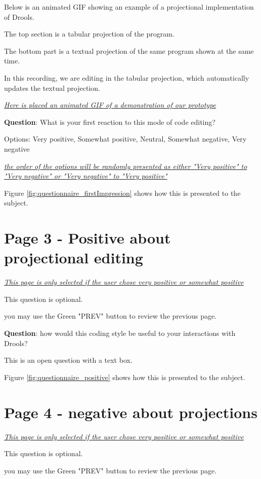 Below is an animated GIF showing an example of a projectional implementation of Drools.

The top section is a tabular projection of the program.

The bottom part is a textual projection of the same program shown at the same time.

In this recording, we are editing in the tabular projection, which automatically updates the textual projection.

\emph{\underline{Here is placed an animated GIF of a demonstration of our prototype}}

\textbf{Question}: What is your first reaction to this mode of code editing?

Options: Very positive, Somewhat positive, Neutral, Somewhat negative, Very negative 

\emph{\underline{the order of the options will be randomly presented as either "Very positive" to "Very negative" or "Very negative" to "Very positive"}}

Figure \ref{fig:questionnaire_firstImpression} shows how this is presented to the subject.

\section{Page 3 - Positive about projectional editing}

\emph{\underline{This page is only selected if the user chose very positive or somewhat positive}}

This question is optional.

you may use the Green "PREV" button to review the previous page.

\textbf{Question}: how would this coding style be useful to your interactions with Drools?

This is an open question with a text box.

Figure \ref{fig:questionnaire_positive} shows how this is presented to the subject.

\section{Page 4 - negative about projections}

\emph{\underline{This page is only selected if the user chose very positive or somewhat positive}}

This question is optional.

you may use the Green "PREV" button to review the previous page.

